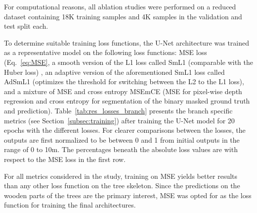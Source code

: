 For computational reasons, all ablation studies were performed on a reduced dataset containing 18K training samples and 4K samples in the validation and test split each. 

To determine suitable training loss functions, the U-Net architecture was trained as a representative model on the following loss functions: MSE loss (Eq.~\ref{eq:MSE}, a smooth version of the L1 loss called SmL1 (comparable with the Huber loss)%
, an adaptive version of the aforementioned SmL1 loss called AdSmL1 (optimizes the threshold for switching between the L2 to the L1 loss), and a mixture of MSE and cross entropy MSEmCE (MSE for pixel-wise depth regression and cross entropy for segmentation of the binary masked ground truth and prediction). Table~\ref{tab:res_losses_branch} presents the branch specific metrics (see Section~\mbox{\ref{subsec:training}}) after training the U-Net model for 20 epochs with the different losses. For clearer comparisons between the losses, the outputs are first normalized to be between 0 and 1 from initial outputs in the range of 0 to 10m. The percentages beneath the absolute loss values are with respect to the MSE loss in the first row.

For all metrics considered in the study, training on MSE yields better results than any other loss function on the tree skeleton. Since the predictions on the wooden parts of the trees are the primary interest, MSE was opted for as the loss function for training the final architectures.  


